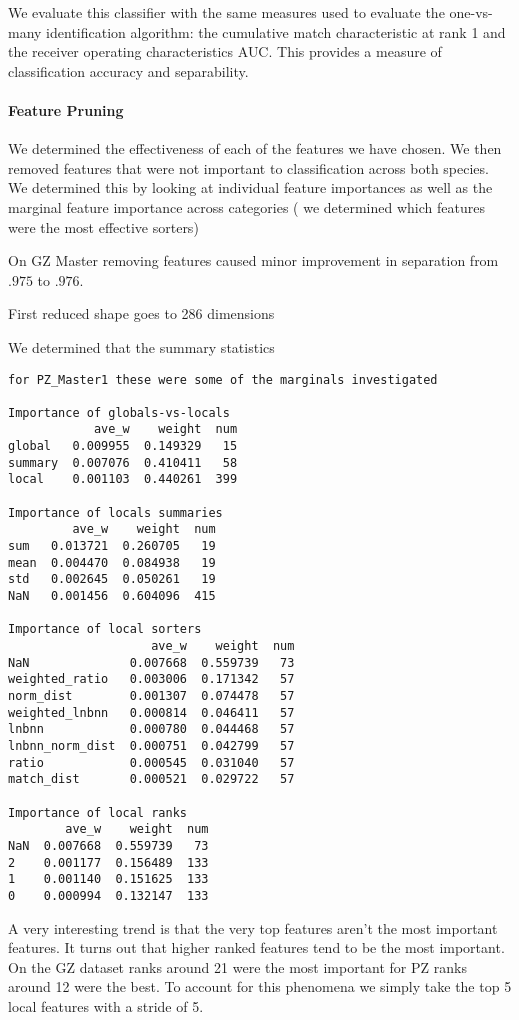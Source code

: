 We evaluate this classifier with the same measures used to evaluate the
  one-vs-many identification algorithm:
the cumulative match characteristic at rank 1 and the receiver operating
  characteristics AUC{}.
This provides a measure of classification accuracy and separability.

\paragraph{Feature Pruning}
We determined the effectiveness of each of the features we have chosen.  We
then removed features that were not important to classification across both
species. We determined this by looking at individual feature importances as
well as the marginal feature importance across categories (\eg{} we determined
which features were the most effective sorters)

On GZ Master removing features caused minor improvement in separation from
$.975$ to $.976$.

First reduced shape goes to 286 dimensions

We determined that the summary statistics 
\begin{verbatim}
for PZ_Master1 these were some of the marginals investigated

Importance of globals-vs-locals
            ave_w    weight  num
global   0.009955  0.149329   15
summary  0.007076  0.410411   58
local    0.001103  0.440261  399

Importance of locals summaries
         ave_w    weight  num
sum   0.013721  0.260705   19
mean  0.004470  0.084938   19
std   0.002645  0.050261   19
NaN   0.001456  0.604096  415

Importance of local sorters
                    ave_w    weight  num
NaN              0.007668  0.559739   73
weighted_ratio   0.003006  0.171342   57
norm_dist        0.001307  0.074478   57
weighted_lnbnn   0.000814  0.046411   57
lnbnn            0.000780  0.044468   57
lnbnn_norm_dist  0.000751  0.042799   57
ratio            0.000545  0.031040   57
match_dist       0.000521  0.029722   57

Importance of local ranks
        ave_w    weight  num
NaN  0.007668  0.559739   73
2    0.001177  0.156489  133
1    0.001140  0.151625  133
0    0.000994  0.132147  133
\end{verbatim}


A very interesting trend is that the very top features aren't the most
important features.  It turns out that higher ranked features tend to be the
most important.  On the GZ dataset ranks around 21 were the most important for
PZ ranks around 12 were the best. To account for this phenomena we simply take
the top 5 local features with a stride of 5.

